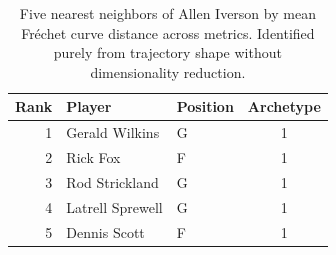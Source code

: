 \begin{table}[htbp]
  \centering\small
  \begin{tabular}{rllc}
    \toprule
    Rank & Player & Position & Archetype \\
    \midrule
    1 & Gerald Wilkins & G & 1 \\
    2 & Rick Fox & F & 1 \\
    3 & Rod Strickland & G & 1 \\
    4 & Latrell Sprewell & G & 1 \\
    5 & Dennis Scott & F & 1 \\
    \bottomrule
  \end{tabular}
  \caption{Five nearest neighbors of Allen Iverson by mean Fr\'{e}chet curve distance across metrics. Identified purely from trajectory shape without dimensionality reduction.}
  \label{tab:Allen_Iverson_frechet_curve_neighbors}
\end{table}

